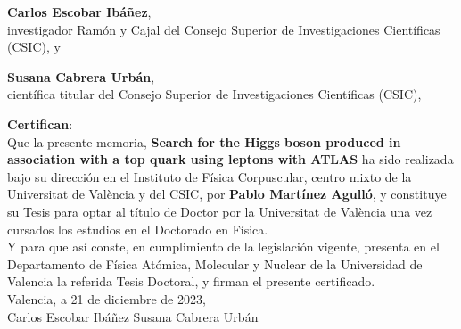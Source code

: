 \begin{titlepage}
\cleardoublepage
\thispagestyle{empty}

\thispagestyle{empty}

\vspace*{3cm}

\noindent \textbf{Carlos Escobar Ibáñez},\\
investigador Ramón y Cajal del Consejo Superior de Investigaciones Cient\'ificas (CSIC), y \vspace{0.2cm}

\noindent \textbf{Susana Cabrera Urbán},\\
cient\'ifica titular del Consejo Superior de Investigaciones Cient\'ificas (CSIC), \vspace{0.2cm}

\noindent \textbf{Certifican}:\\[2ex]
%
\noindent Que la presente memoria, 
\textbf{Search for the Higgs boson produced in association with a top quark using \Ptau leptons with ATLAS}
ha sido realizada bajo su direcci{\'o}n en el Instituto de F{\'i}sica Corpuscular, centro mixto de la Universitat de València y del CSIC, por \textbf{Pablo Martínez Agulló}, y constituye su Tesis para optar al título de Doctor por la Universitat de València una vez cursados los estudios en el Doctorado en Física.\\[2ex]




%
\noindent Y para que as\'i conste, en cumplimiento de la legislaci\'on vigente, presenta en el Departamento de F\'isica At\'omica, Molecular y Nuclear de la Universidad de Valencia la referida Tesis Doctoral, y firman el presente certificado.\\[4ex]

\noindent Valencia, a 21 de diciembre de 2023,\\[12ex]

\noindent \hspace{2cm} Carlos Escobar Ib\'añez \hspace{2cm} Susana Cabrera Urb\'an


\newpage
\thispagestyle{empty}
$$ $$
\newpage
\thispagestyle{empty}
\end{titlepage}
